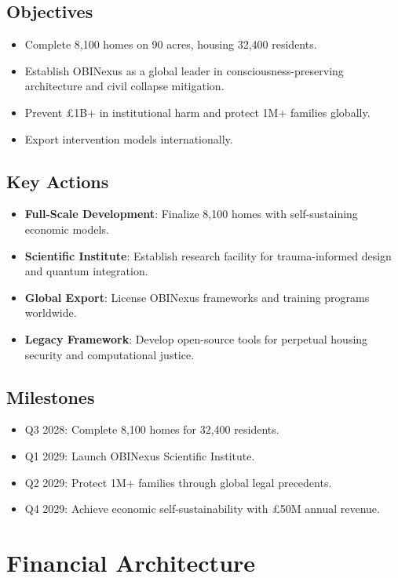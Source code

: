 \documentclass[12pt]{article}\usepackage[a4paper,margin=1in]{geometry}
\begin{document}
\subsection*{Objectives}
\begin{itemize}
    \item Complete 8,100 homes on 90 acres, housing 32,400 residents.
    \item Establish OBINexus as a global leader in consciousness-preserving architecture and civil collapse mitigation.
    \item Prevent £1B+ in institutional harm and protect 1M+ families globally.
    \item Export intervention models internationally.
\end{itemize}\subsection*{Key Actions}
\begin{itemize}
    \item \textbf{Full-Scale Development}: Finalize 8,100 homes with self-sustaining economic models.
    \item \textbf{Scientific Institute}: Establish research facility for trauma-informed design and quantum integration.
    \item \textbf{Global Export}: License OBINexus frameworks and training programs worldwide.
    \item \textbf{Legacy Framework}: Develop open-source tools for perpetual housing security and computational justice.
\end{itemize}\subsection*{Milestones}
\begin{itemize}
    \item Q3 2028: Complete 8,100 homes for 32,400 residents.
    \item Q1 2029: Launch OBINexus Scientific Institute.
    \item Q2 2029: Protect 1M+ families through global legal precedents.
    \item Q4 2029: Achieve economic self-sustainability with £50M annual revenue.
\end{itemize}\section*{Financial Architecture}
\end{document}
